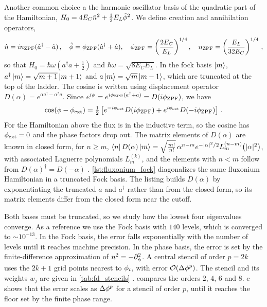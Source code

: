 Another common choice a the harmonic oscillator basis of the quadratic part of the Hamiltonian, $H_0 = 4E_C\hat{n}^2 + \tfrac{1}{2}E_L\hat{\phi}^2$.
We define creation and annihilation operators,
\begin{align}
  \hat {n} = in_{\rm ZPF}(\hat a^\dagger - \hat a) \,, \quad \hat {\phi} = \phi_{\rm ZPF}(\hat a^\dagger + \hat a), \quad \phi_{\rm ZPF} = \left(\frac{2E_C}{E_L}\right)^{1/4} , \quad n_{\rm ZPF} = \left(\frac{E_L}{32E_C}\right)^{1/4} \, ,
\end{align}
so that $H_0 = \hbar\omega\left(a^\dagger a + \tfrac{1}{2}\right)$ and $\hbar\omega = \sqrt{8E_C E_L}$.
In the fock basis $\ket{m}$, $a^\dagger\ket{m} = \sqrt{m+1}\ket{m+1}$ and $a\ket{m} = \sqrt{m}\ket{m-1}$, which are truncated at the top of the ladder.
The cosine is written using displacement operator $D(\alpha) = e^{\alpha a^\dagger - \alpha^* a}$.
Since $e^{i\phi} = e^{i\phi_{\rm ZPF}(a^\dagger + a)} = D(i\phi_{\rm ZPF})$, we have
\begin{align}
  \cos(\phi-\phi_{\rm ext}) = \tfrac{1}{2}\left[e^{-i\phi_{\rm ext}}D(i\phi_{\rm ZPF}) + e^{i\phi_{\rm ext}}D(-i\phi_{\rm ZPF})\right] \, .
\end{align}
For the Hamiltonian above the flux is in the inductive term, so the cosine has $\phi_{\rm ext}=0$ and the phase factors drop out.
The matrix elements of $D(\alpha)$ are known in closed form, for $n \geq m$, $\bra{n}D(\alpha)\ket{m} = \sqrt{\frac{m!}{n!}}\,\alpha^{n-m}e^{-|\alpha|^2/2}L_m^{(n-m)}\!\left(|\alpha|^2\right)$, with associated Laguerre polynomials $L_m^{(k)}$, and the elements with $n < m$ follow from $D(\alpha)^\dagger = D(-\alpha)$ \cite{CarltonCavesInternal}.
\cref{lst:fluxonium_fock} diagonalizes the same fluxonium Hamiltonian in a truncated Fock basis.
The listing builds $D(\alpha)$ by exponentiating the truncated $a$ and $a^\dagger$ rather than from the closed form, so its matrix elements differ from the closed form near the cutoff.

Both bases must be truncated, so we study how the lowest four eigenvalues converge.
As a reference we use the Fock basis with $140$ levels, which is converged to $\sim10^{-13}$.
In the Fock basis, the error falls exponentially with the number of levels until it reaches machine precision.
In the phase basis, the error is set by the finite-difference approximation of $n^2 = -\partial_\phi^2$.
A central stencil of order $p=2k$ uses the $2k+1$ grid points nearest to $\phi_i$, with error $\mathcal{O}(\Delta\phi^{p})$.
The stencil and its weights $w_j$ are given in \cref{tab:fd_stencils} \cite{fornbergGenerationFiniteDifference1988}.
 compares the orders $2$, $4$, $6$ and $8$.
c shows that the error scales as $\Delta\phi^{p}$ for a stencil of order $p$, until it reaches the floor set by the finite phase range.

